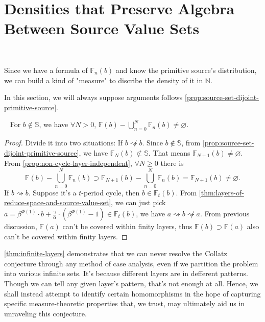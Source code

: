 \section{Densities that Preserve Algebra Between Source Value Sets}~\label{sec:densities-that-preserve-algebra-between-source-value-sets}

Since we have a formula of $\mathbb{F}_{n}(b)$ and know the primitive source's distribution, we can build a kind of "measure" to discribe the density of it in $\mathbb{N}$.

In this section, we will always suppose arguments follows \cref{prop:source-set-dijoint-primitive-source}.
\begin{theorem}~\label{thm:infinite-layers}
	For $b\not\in\mathbb{S}$, we have $\forall N > 0$, $\mathbb{F}(b) - \bigcup_{n=0}^{N}\mathbb{F}_{n}(b) \ne \varnothing$.
\end{theorem}
\begin{proof}
	Divide it into two situations:\newline
	If $b \not\rightsquigarrow b$. Since $b\not\in\mathbb{S}$, from \cref{prop:source-set-dijoint-primitive-source}, we have $\mathbb{F}_{N}(b) \not\subset \mathbb{S}$. That means $\mathbb{F}_{N + 1}(b) \ne \varnothing$.
	From \cref{prop:non-cycle-layer-independent}, $\forall N \ge 0$ there is
	\[\mathbb{F}(b) - \bigcup_{n=0}^{N}\mathbb{F}_{n}(b) \supset \mathbb{F}_{N+1}(b) - \bigcup_{n=0}^{N}\mathbb{F}_{n}(b) = \mathbb{F}_{N+1}(b) \ne \varnothing.\]
	If $b \rightsquigarrow b$. Suppose it's a $t$-period cycle, then $b \in\mathbb{F}_{t}(b)$. From \cref{thm:layers-of-reduce-space-and-source-value-set}, we can just pick $a = \beta^{\Phi(1)}\cdot b + \frac{\gamma}{\alpha}\cdot(\beta^{\Phi(1)} - 1)\in\mathbb{F}_{t}(b)$, we have $a \rightsquigarrow b \not\rightsquigarrow a$. From previous discussion, $\mathbb{F}(a)$ can't be covered within finity layers, thus $\mathbb{F}(b) \supset \mathbb{F}(a)$ also can't be covered within finity layers.
\end{proof}

\cref{thm:infinite-layers} demonstrates that we can never resolve the Collatz conjecture through any method of case analysis, even if we partition the problem into various infinite sets.
It's because different layers are in defferent patterns. Though we can tell any given layer's pattern, that's not enough at all.
Hence, we shall instead attempt to identify certain homomorphisms in the hope of capturing specific measure-theoretic properties that, we trust, may ultimately aid us in unraveling this conjecture.

